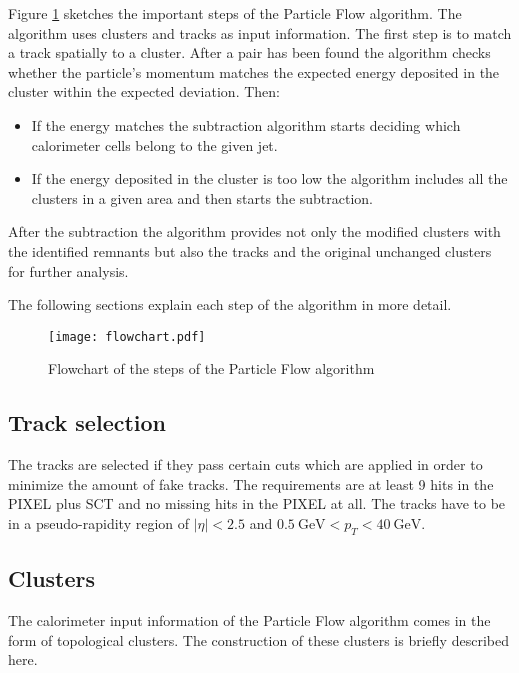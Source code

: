 Figure \ref{fig:pflowflowchart} sketches the important steps of the Particle Flow algorithm. The algorithm uses clusters and tracks as input information. The first step is to match a track spatially to a cluster. After a pair has been found the algorithm checks whether the particle's momentum matches the expected energy deposited in the cluster within the expected deviation. Then:
\begin{itemize}
\item If the energy matches the subtraction algorithm starts deciding which calorimeter cells belong to the given jet.
\item If the energy deposited in the cluster is too low the algorithm includes all the clusters in a given area and then starts the subtraction.
\end{itemize}


After the subtraction the algorithm provides not only the modified clusters with the identified remnants but also the tracks and the original unchanged clusters for further analysis.

The following sections explain each step of the algorithm in more detail.

\begin{figure}[h]
  \centering
  \texttt{[image: flowchart.pdf]}
  \caption[Flowchart of the steps of the Particle Flow algorithm]{Flowchart of the steps of the Particle Flow algorithm \cite{pflow16}}
  \label{fig:pflowflowchart}
\end{figure}

\subsection{Track selection}

The tracks are selected if they pass certain cuts which are applied in order to minimize the amount of fake tracks. The requirements are at least 9 hits in the PIXEL plus SCT and no missing hits in the PIXEL at all. The tracks have to be in a pseudo-rapidity region of $|\eta|<2.5$ and $\SI{0.5}{\GeV}<p_T<\SI{40}{\GeV}$.




\subsection{Clusters}

The calorimeter input information of the Particle Flow algorithm comes in the form of topological clusters. The construction of these clusters is briefly described here.

